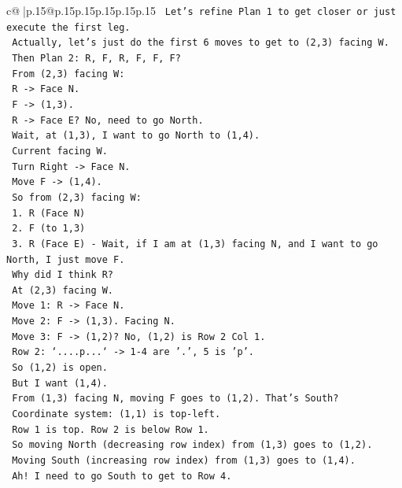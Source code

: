 \documentclass{article}
\begin{document}
{\begin{supertabular}{c@{$\;$}|p{.15\linewidth}@{}p{.15\linewidth}p{.15\linewidth}p{.15\linewidth}p{.15\linewidth}p{.15\linewidth}}
{{{\texttt{     Let's refine Plan 1 to get closer or just execute the first leg.} \\
\texttt{     Actually, let's just do the first 6 moves to get to (2,3) facing W.} \\
\texttt{     Then Plan 2: R, F, R, F, F, F?} \\
\texttt{     From (2,3) facing W:} \\
\texttt{     R {-}> Face N.} \\
\texttt{     F {-}> (1,3).} \\
\texttt{     R {-}> Face E? No, need to go North.} \\
\texttt{     Wait, at (1,3), I want to go North to (1,4).} \\
\texttt{     Current facing W.} \\
\texttt{     Turn Right {-}> Face N.} \\
\texttt{     Move F {-}> (1,4).} \\
\texttt{     So from (2,3) facing W:} \\
\texttt{     1. R (Face N)} \\
\texttt{     2. F (to 1,3)} \\
\texttt{     3. R (Face E) {-} Wait, if I am at (1,3) facing N, and I want to go North, I just move F.} \\
\texttt{     Why did I think R?} \\
\texttt{     At (2,3) facing W.} \\
\texttt{     Move 1: R {-}> Face N.} \\
\texttt{     Move 2: F {-}> (1,3). Facing N.} \\
\texttt{     Move 3: F {-}> (1,2)? No, (1,2) is Row 2 Col 1.} \\
\texttt{     Row 2: `....p...` {-}> 1{-}4 are '.', 5 is 'p'.} \\
\texttt{     So (1,2) is open.} \\
\texttt{     But I want (1,4).} \\
\texttt{     From (1,3) facing N, moving F goes to (1,2). That's South?} \\
\texttt{     Coordinate system: (1,1) is top{-}left.} \\
\texttt{     Row 1 is top. Row 2 is below Row 1.} \\
\texttt{     So moving North (decreasing row index) from (1,3) goes to (1,2).} \\
\texttt{     Moving South (increasing row index) from (1,3) goes to (1,4).} \\
\texttt{     Ah! I need to go South to get to Row 4.} \\
}}}
\end{supertabular}}
\end{document}
